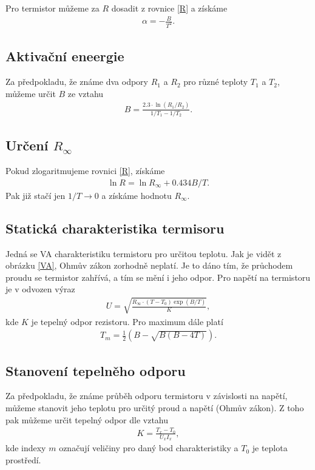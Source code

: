 \documentclass[a4paper,12pt]{article}
\begin{document}
Pro termistor můžeme za $R$ dosadit z rovnice \ref{R} a získáme
\begin{eqnarray}
    \alpha=-\frac{B}{T^2}.
    \label{alpha}
\end{eqnarray}

\subsection{Aktivační eneergie}
Za předpokladu, že známe dva odpory $R_1$ a $R_2$ pro různé teploty $T_1$ a $T_2$, můžeme určit $B$ ze vztahu
\begin{eqnarray}
    B=\frac{2.3\cdot\ln(R_1/R_2)}{1/T_1-1/T_2}.
\end{eqnarray}

\subsection{Určení $R_\infty$}
Pokud zlogaritmujeme rovnici \ref{R}, získáme
\begin{eqnarray}
    \ln R=\ln R_\infty+0.434B/T.
\end{eqnarray}
Pak již stačí jen $1/T \to 0$ a získáme hodnotu $R_\infty$.

\subsection{Statická charakteristika termisoru}
Jedná se VA charakteristiku termistoru pro určitou teplotu. Jak je vidět z obrázku \ref{VA}, Ohmův zákon zorhodně neplatí. 
Je to dáno tím, že průchodem proudu se termistor zahřívá, a tím se mění i jeho odpor. Pro napětí na termistoru je v \cite{text} 
odvozen výraz
\begin{eqnarray}
U=\sqrt{\frac{R_\infty\cdot(T-T_0)\exp(B/T)}{K}},
\end{eqnarray}
kde $K$ je tepelný odpor rezistoru. Pro maximum dále platí
\begin{eqnarray}
T_m=\frac{1}{2}(B-\sqrt{B(B-4T)}).
\end{eqnarray}

\subsection{Stanovení tepelněho odporu}
Za předpokladu, že známe průběh odporu termistoru v závislosti na napětí, můžeme stanovit jeho teplotu pro určitý proud a napětí (Ohmův zákon). 
Z toho pak můžeme určit tepelný odpor dle vztahu
\begin{eqnarray}
K=\frac{T_x-T_0}{U_xI_x},
\end{eqnarray}
kde indexy $m$ označují veličiny pro daný bod charakteristiky a $T_0$ je teplota prostředí.
\end{document}
